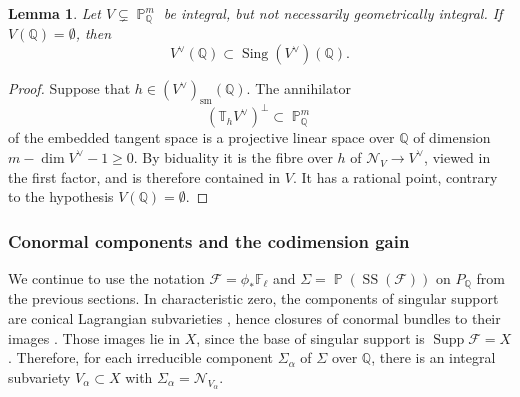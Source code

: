 \documentclass[a4paper,11pt, twoside,reqno]{amsart}
\theoremstyle{plain}
\newtheorem{lemma}[thm]{Lemma}
\theoremstyle{definition}
\theoremstyle{remark}
\newcommand{\QQ}{\mathbb{Q}}
\DeclareMathOperator{\PP}{\mathbb{P}}
\DeclareMathOperator{\Sing}{Sing}
\renewcommand{\geq}{\geqslant}
\newcommand{\FF}{\mathbb{F}}
\numberwithin{equation}{section}
\begin{document}
\begin{lemma}\label{app:ss:lem:dual-rational}
Let $V\subsetneq\PP^m_\QQ$ be integral, but not necessarily geometrically
integral. If $V(\QQ)=\emptyset$, then
\[
 V^\vee(\QQ)\subset\Sing(V^\vee)(\QQ).
\]
\end{lemma}
\begin{proof}
Suppose that $h\in(V^\vee)_{\mathrm{sm}}(\QQ)$.
The annihilator
\[
 (\mathbb T_hV^\vee)^\perp\subset\PP^m_\QQ
\]
of the embedded tangent space is a projective linear space over $\QQ$
of dimension $m-\dim V^\vee-1\geq0$. By biduality it is the fibre
over $h$ of $\mathcal N_V\to V^\vee$, viewed in the first factor,
and is therefore contained in $V$. It has a rational point,
contrary to the hypothesis $V(\QQ)=\emptyset$.
\end{proof}

\subsubsection{Conormal components and the codimension gain}
We continue to use the notation $\mathcal F=\phi_*\FF_\ell$ and $\Sigma=\PP(\operatorname{SS}(\mathcal F))$ on $P_\QQ$ from the previous sections.
In characteristic zero, the components of singular support are conical
Lagrangian subvarieties \cite[Remark after Theorem~1.3]{Bei},
hence closures of conormal bundles to their images
\cite[Theorem~1.9]{Tevelev}. Those images lie in $X$, since the base
of singular support is $\operatorname{Supp} \mathcal F=X$. Therefore, for each irreducible component
$\Sigma_\alpha$ of $\Sigma$ over $\QQ$, there is an integral subvariety
$V_\alpha\subset X$ with $\Sigma_\alpha=\mathcal N_{V_\alpha}$.
\end{document}
